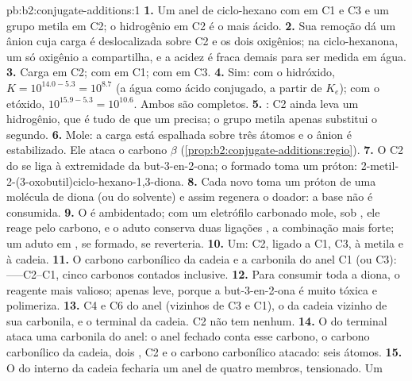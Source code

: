 \begin{solution}{pb:b2:conjugate-additions:1}
\textbf{1.} Um anel de ciclo-hexano com  em C1 e C3 e um grupo metila em C2; o hidrogênio em
C2 é o mais ácido.
\textbf{2.} Sua remoção dá um ânion cuja carga é deslocalizada sobre C2 e os dois oxigênios; na
ciclo-hexanona, um só oxigênio a compartilha, e a acidez é fraca demais para ser medida em água.
\textbf{3.} Carga em C2;  com  em C1;  com  em C3.
\textbf{4.} Sim: com o hidróxido, $K = 10^{14.0 - 5.3} = 10^{8.7}$ (a água como ácido conjugado, a partir
de $K_e$); com o etóxido, $10^{15.9-5.3} = 10^{10.6}$. Ambos são completos.
\textbf{5.} : C2 ainda leva um hidrogênio, que é tudo de que um  precisa; o
grupo metila apenas substitui o segundo.
\textbf{6.} Mole: a carga está espalhada sobre três átomos e o ânion é estabilizado. Ele ataca o
carbono $\beta$ (\cref{prop:b2:conjugate-additions:regio}).
\textbf{7.} O C2 do  se liga à extremidade  da but-3-en-2-ona; o  formado toma
um próton: 2-metil-2-(3-oxobutil)ciclo-hexano-1,3-diona.
\textbf{8.} Cada novo  toma um próton de uma molécula de diona (ou do solvente) e assim
regenera o  doador: a base não é consumida.
\textbf{9.} O  é ambidentado; com um eletrófilo carbonado mole, sob , ele reage
pelo carbono, e o aduto  conserva duas ligações , a combinação mais forte; um
aduto em , se formado, se reverteria.
\textbf{10.} Um: C2, ligado a C1, C3, à metila e à cadeia.
\textbf{11.} O carbono carbonílico da cadeia e a carbonila do anel C1 (ou C3): ------C2--C1,
cinco carbonos contados inclusive.
\textbf{12.} Para consumir toda a diona, o reagente mais valioso; apenas leve, porque a but-3-en-2-ona
é muito tóxica e polimeriza.
\textbf{13.} C4 e C6 do anel (vizinhos de C3 e C1), o  da cadeia vizinho de sua carbonila, e o
 terminal da cadeia. C2 não tem nenhum.
\textbf{14.} O  do  terminal ataca uma carbonila do anel: o anel fechado conta esse
carbono, o carbono carbonílico da cadeia, dois , C2 e o carbono carbonílico atacado: seis átomos.
\textbf{15.} O  do  interno da cadeia fecharia um anel de quatro membros, tensionado. Um

\end{solution}
